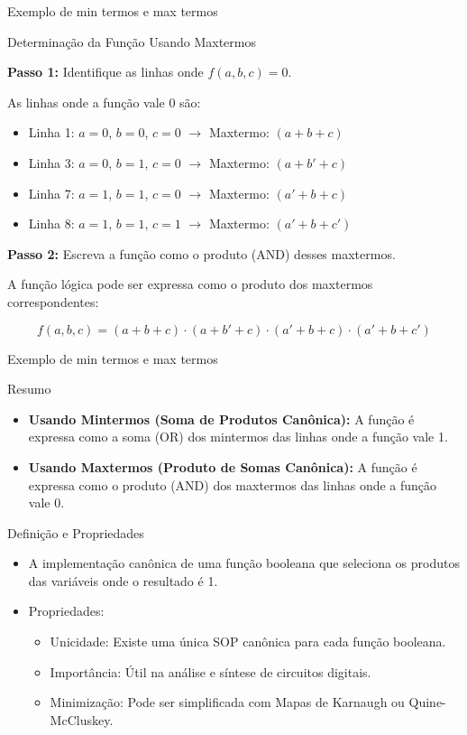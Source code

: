 	\begin{frame}{Exemplo de min termos e max termos}
		\par{Determinação da Função Usando Maxtermos}
		
		\textbf{Passo 1:} Identifique as linhas onde \(f(a, b, c) = 0\).
		
		As linhas onde a função vale 0 são:
		\begin{itemize}
			\item Linha 1: \(a = 0\), \(b = 0\), \(c = 0\)  \(\rightarrow\) Maxtermo: \((a + b + c)\)
			\item Linha 3: \(a = 0\), \(b = 1\), \(c = 0\)  \(\rightarrow\) Maxtermo: \((a + b' + c)\)
			\item Linha 7: \(a = 1\), \(b = 1\), \(c = 0\)  \(\rightarrow\) Maxtermo: \((a' + b + c)\)
			\item Linha 8: \(a = 1\), \(b = 1\), \(c = 1\)  \(\rightarrow\) Maxtermo: \((a' + b + c')\)
		\end{itemize}
		
		\textbf{Passo 2:} Escreva a função como o produto (AND) desses maxtermos.
		
		A função lógica pode ser expressa como o produto dos maxtermos correspondentes:
		
		\[
		f(a, b, c) = (a + b + c) \cdot (a + b' + c) \cdot (a' + b + c) \cdot (a' + b + c')
		\]
	\end{frame}
	
	\begin{frame}{Exemplo de min termos e max termos}
		\par{Resumo}
		
		\begin{itemize}
			\item \textbf{Usando Mintermos (Soma de Produtos Canônica):} A função é expressa como a soma (OR) dos mintermos das linhas onde a função vale 1.
			\item \textbf{Usando Maxtermos (Produto de Somas Canônica):} A função é expressa como o produto (AND) dos maxtermos das linhas onde a função vale 0.
		\end{itemize}
		
	\end{frame}


\begin{frame}{Definição e Propriedades}
	\begin{itemize}
		\item A implementação canônica de uma função booleana que seleciona os produtos das variáveis onde o resultado é 1.
		\item Propriedades:
		\begin{itemize}
			\item Unicidade: Existe uma única SOP canônica para cada função booleana.
			\item Importância: Útil na análise e síntese de circuitos digitais.
			\item Minimização: Pode ser simplificada com Mapas de Karnaugh ou Quine-McCluskey.
		\end{itemize}
	\end{itemize}
\end{frame}

